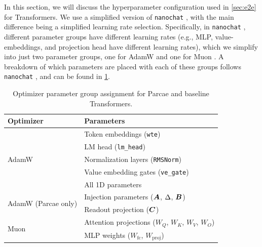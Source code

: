 In this section, we will discuss the hyperparameter configuration used in \cref{sec:e2e} for Transformers. We use a simplified version of \texttt{nanochat} \citep{nanochat}, with the main difference being a simplified learning rate selection. Specifically, in \texttt{nanochat} \citep{nanochat}, different parameter groups have different learning rates (e.g., MLP, value-embeddings, and projection head have different learning rates), which we simplify into just two parameter groups, one for AdamW \citep{kingma2017adammethodstochasticoptimization,loshchilov2019decoupledweightdecayregularization} and one for Muon \citep{jordan2024muon}. A breakdown of which parameters are placed with each of these groups follows \texttt{nanochat} \citep{nanochat}, and can be found in \cref{tab:parameter-groups}.

\begin{table}[!h]
  \centering
  \small
  \begin{tabular}{ll}
  \toprule
      \textbf{Optimizer} & \textbf{Parameters} \\
  \midrule
      \multirow{5}{*}{AdamW \citep{kingma2017adammethodstochasticoptimization}}
      & Token embeddings (\texttt{wte}) \\
      & LM head (\texttt{lm\_head}) \\
      & Normalization layers (\texttt{RMSNorm}) \\
      & Value embedding gates (\texttt{ve\_gate}) \\
      & All 1D parameters \\
  \midrule
      \multirow{2}{*}{AdamW \citep{kingma2017adammethodstochasticoptimization} (Parcae only)}
      & Injection parameters ($\bm{A}$, $\Delta$, $\bm{B}$) \\
      & Readout projection ($\bm{C}$) \\
  \midrule
      \multirow{2}{*}{Muon \citep{jordan2024muon}}
      & Attention projections ($W_Q$, $W_K$, $W_V$, $W_O$) \\
      & MLP weights ($W_{\text{fc}}$, $W_{\text{proj}}$) \\
  \bottomrule
  \end{tabular}
  \caption{Optimizer parameter group assignment for Parcae and baseline Transformers.}
  \label{tab:parameter-groups}
\end{table}

